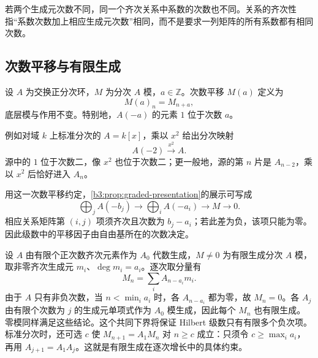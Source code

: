 若两个生成元次数不同，同一个齐次关系中系数的次数也不同。关系的齐次性指“系数次数加上相应生成元次数”相同，而不是要求一列矩阵的所有系数都有相同次数。

\subsection{次数平移与有限生成}
\label{b3:subsec:1101:03}

\begin{definition}\label{b3:def:grading-shift}
	设 \(A\) 为交换正分次环，\(M\) 为分次 \(A\) 模，\(a\in\mathbb Z\)。次数平移 \(M(a)\) 定义为
	\[
		M(a)_n=M_{n+a},
	\]
	底层模与作用不变。特别地，\(A(-a)\) 的元素 \(1\) 位于次数 \(a\)。
\end{definition}

例如对域 \(k\) 上标准分次的 \(A=k[x]\)，乘以 \(x^2\) 给出分次映射
\[
	A(-2)\xrightarrow{\ x^2\ }A.
\]
源中的 \(1\) 位于次数二，像 \(x^2\) 也位于次数二；更一般地，源的第 \(n\) 片是 \(A_{n-2}\)，乘以 \(x^2\) 后恰好进入 \(A_n\)。

\ProseParagraphBreak
用这一次数平移约定，\cref{b3:prop:graded-presentation}的展示可写成
\[
	\bigoplus_j A(-b_j)\longrightarrow\bigoplus_i A(-a_i) \longrightarrow M\longrightarrow0.
\]
相应关系矩阵第 \((i,j)\) 项须齐次且次数为 \(b_j-a_i\)；若此差为负，该项只能为零。因此级数中的平移因子由自由基所在的次数决定。

\ProseParagraphBreak
设 \(A\) 由有限个正次数齐次元素作为 \(A_0\) 代数生成，\(M\ne0\) 为有限生成分次 \(A\) 模，取非零齐次生成元 \(m_i\)、\(\deg m_i=a_i\)。逐次取分量有
\[
	M_n=\sum_i A_{n-a_i}m_i.
\]
由于 \(A\) 只有非负次数，当 \(n<\min_i a_i\) 时，各 \(A_{n-a_i}\) 都为零，故 \(M_n=0\)。各 \(A_j\) 由有限个次数为 \(j\) 的生成元单项式作为 \(A_0\) 模生成，因此每个 \(M_n\) 也有限生成。零模同样满足这些结论。这个共同下界将保证 Hilbert 级数只有有限多个负次项。标准分次时，还可选 \(c\) 使 \(M_{n+1}=A_1M_n\) 对 \(n\ge c\) 成立：只须令 \(c\ge\max_i a_i\)，再用 \(A_{j+1}=A_1A_j\)。这就是有限生成在逐次增长中的具体约束。
